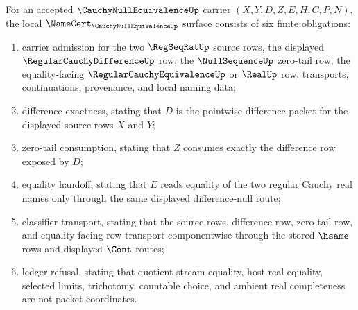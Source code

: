 \begin{theorem}
\label{thm:cauchy-null-equivalence-namecert-obligations}
For an accepted $\CauchyNullEquivalenceUp$ carrier $(X,Y,D,Z,E,H,C,P,N)$, the local $\NameCert_{\CauchyNullEquivalenceUp}$ surface consists of six finite obligations:
\begin{enumerate}
\item carrier admission for the two $\RegSeqRatUp$ source rows, the displayed $\RegularCauchyDifferenceUp$ row, the $\NullSequenceUp$ zero-tail row, the equality-facing $\RegularCauchyEquivalenceUp$ or $\RealUp$ row, transports, continuations, provenance, and local naming data;
\item difference exactness, stating that $D$ is the pointwise difference packet for the displayed source rows $X$ and $Y$;
\item zero-tail consumption, stating that $Z$ consumes exactly the difference row exposed by $D$;
\item equality handoff, stating that $E$ reads equality of the two regular Cauchy real names only through the same displayed difference-null route;
\item classifier transport, stating that the source rows, difference row, zero-tail row, and equality-facing row transport componentwise through the stored $\hsame$ rows and displayed $\Cont$ routes;
\item ledger refusal, stating that quotient stream equality, host real equality, selected limits, trichotomy, countable choice, and ambient real completeness are not packet coordinates.
\end{enumerate}
\end{theorem}
